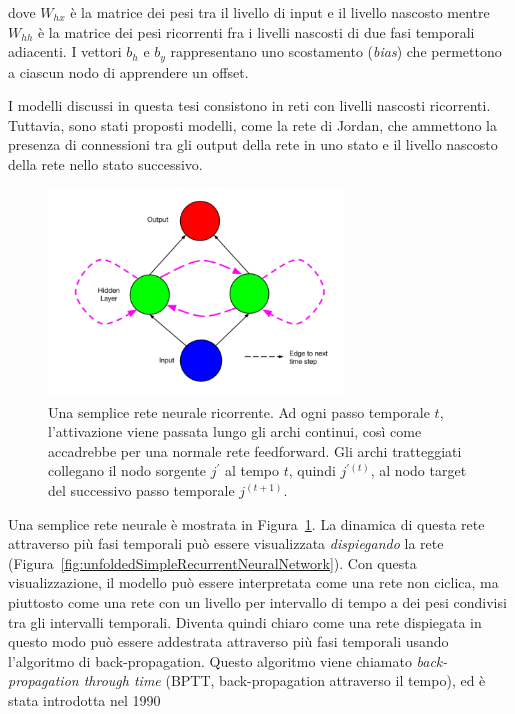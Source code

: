 dove $W_{hx}$ \`e la matrice dei pesi tra il livello di input e il livello nascosto mentre $W_{hh}$ \`e la matrice dei pesi ricorrenti fra i livelli nascosti di due fasi temporali adiacenti.
I vettori $b_h$ e $b_y$ rappresentano uno scostamento (\emph{bias}) che permettono a ciascun nodo di apprendere un offset.

I modelli discussi in questa tesi consistono in reti con livelli nascosti ricorrenti.
Tuttavia, sono stati proposti modelli, come la rete di Jordan, che ammettono la presenza di connessioni tra gli output della rete in uno stato e il livello nascosto della rete nello stato successivo.

\begin{figure}[tp]
  \centering
  \begin{center}
    \includegraphics[width=0.7\textwidth]{./images/simpleRecurrentNeuralNetwork.png}
  \end{center}
  \caption{Una semplice rete neurale ricorrente.
  Ad ogni passo temporale $t$, l'attivazione viene passata lungo gli archi continui, cos\`i come accadrebbe per una normale rete feedforward.
  Gli archi tratteggiati collegano il nodo sorgente $j^{'}$ al tempo $t$, quindi $j^{'(t)}$, al nodo target del successivo passo temporale $j^{(t+1)}$.}
  \label{fig:simpleRecurrentNeuralNetwork}
\end{figure}

Una semplice rete neurale \`e mostrata in Figura~\ref{fig:simpleRecurrentNeuralNetwork}.
La dinamica di questa rete attraverso pi\`u fasi temporali pu\`o essere visualizzata \emph{dispiegando} la rete (Figura~\ref{fig:unfoldedSimpleRecurrentNeuralNetwork}).
Con questa visualizzazione, il modello pu\`o essere interpretata come una rete non ciclica, ma piuttosto come una rete con un livello per intervallo di tempo a dei pesi condivisi tra gli intervalli temporali.
Diventa quindi chiaro come una rete dispiegata in questo modo pu\`o essere addestrata attraverso pi\`u fasi temporali usando l'algoritmo di back-propagation.
Questo algoritmo viene chiamato \emph{back-propagation through time} (BPTT, back-propagation attraverso il tempo), ed \`e stata introdotta nel 1990~\cite{Werbos:1990}

